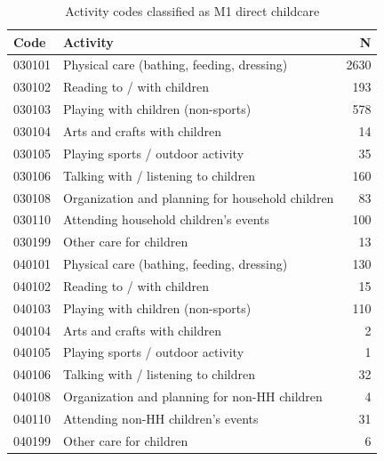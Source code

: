 \begin{table}[ht]
\centering
\begin{tabular}{llr}
  \toprule
Code & Activity & N \\ 
  \midrule
030101 & Physical care (bathing, feeding, dressing) & 2630 \\ 
  030102 & Reading to / with children & 193 \\ 
  030103 & Playing with children (non-sports) & 578 \\ 
  030104 & Arts and crafts with children &  14 \\ 
  030105 & Playing sports / outdoor activity &  35 \\ 
  030106 & Talking with / listening to children & 160 \\ 
  030108 & Organization and planning for household children &  83 \\ 
  030110 & Attending household children's events & 100 \\ 
  030199 & Other care for children &  13 \\ 
  040101 & Physical care (bathing, feeding, dressing) & 130 \\ 
  040102 & Reading to / with children &  15 \\ 
  040103 & Playing with children (non-sports) & 110 \\ 
  040104 & Arts and crafts with children &   2 \\ 
  040105 & Playing sports / outdoor activity &   1 \\ 
  040106 & Talking with / listening to children &  32 \\ 
  040108 & Organization and planning for non-HH children &   4 \\ 
  040110 & Attending non-HH children's events &  31 \\ 
  040199 & Other care for children &   6 \\ 
   \bottomrule
\end{tabular}
\caption{Activity codes classified as M1 direct childcare} 
\label{tab:m1_codes}
\end{table}
